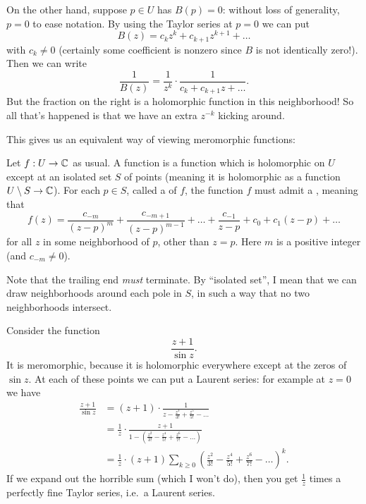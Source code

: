 On the other hand, suppose $p \in U$ has $B(p) = 0$: without loss of generality, $p=0$
to ease notation.
By using the Taylor series at $p=0$ we can put
\[ B(z) = c_k z^k + c_{k+1} z^{k+1} + \dots \]
with $c_k \neq 0$
(certainly some coefficient is nonzero since $B$ is not identically zero!).
Then we can write
\[ \frac{1}{B(z)} = \frac{1}{z^k} \cdot \frac{1}{c_k + c_{k+1}z + \dots}. \]
But the fraction on the right is a holomorphic function in this neighborhood!
So all that's happened is that we have an extra $z^{-k}$ kicking around.


This gives us an equivalent way of viewing meromorphic functions:

\begin{definition}
	Let $f : U \to \mathbb C$ as usual.
	A  function is a function which is holomorphic on $U$
	except at an isolated set $S$ of points (meaning it is holomorphic as a function $U \setminus S \to \mathbb C$).
	For each $p \in S$, called a  of $f$, the function $f$ must admit a ,
	meaning that
	\[
		f(z) =
		\frac{c_{-m}}{(z-p)^m}
		+ \frac{c_{-m+1}}{(z-p)^{m-1}}
		+ \dots
		+ \frac{c_{-1}}{z-p} + c_0 + c_1 (z-p) + \dots
	\]
	for all $z$ in some neighborhood of $p$, other than $z = p$.
	Here $m$ is a positive integer (and $c_{-m} \neq 0$).
\end{definition}
Note that the trailing end \emph{must} terminate.
By ``isolated set'', I mean that we can draw neighborhoods around each pole in $S$,
in such a way that no two neighborhoods intersect.

\begin{example}
	Consider the function \[ \frac{z+1}{\sin z}. \]
	It is meromorphic, because it is holomorphic everywhere except at the zeros of $\sin z$.
	At each of these points we can put a Laurent series: for example at $z=0$ we have
	\begin{align*}
		\frac{z+1}{\sin z}
		&= (z+1) \cdot \frac{1}{z - \frac{z^3}{3!} + \frac{z^5}{5!} - \dots} \\
		&= \frac 1z \cdot \frac{z+1}{1 - \left(%
			\frac{z^2}{3!} - \frac{z^4}{5!} + \frac{z^6}{7!} - \dots \right)} \\
		&= \frac 1z \cdot (z+1) \sum_{k \ge 0} \left( %
			\frac{z^2}{3!}-\frac{z^4}{5!}+\frac{z^6}{7!}-\dots \right)^k.
	\end{align*}
	If we expand out the horrible sum (which I won't do),
	then you get $\frac 1z$ times a perfectly
	fine Taylor series, i.e.\ a Laurent series.
\end{example}

